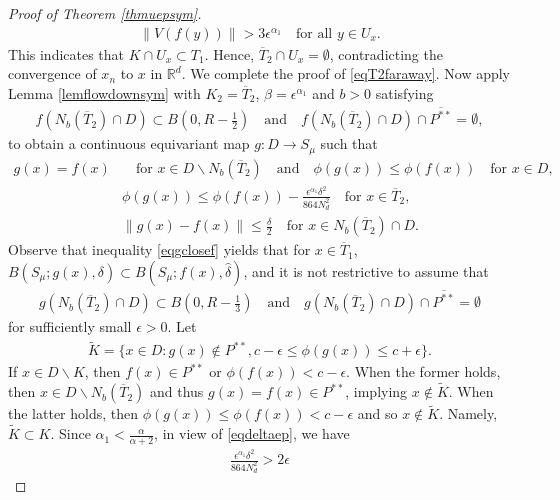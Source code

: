 \documentclass[10pt,a4paper]{article}
\theoremstyle{definition} \theoremstyle{remark}
\numberwithin{equation}{section}
\newcommand{\R}{\mathbb{R}}
\newcommand{\ep}{\epsilon}
\begin{document}
\begin{proof}[Proof of Theorem \ref{thmuepsym}]
	\begin{align*}
		\|V(f(y))\| > 3\ep^{\alpha_1} \quad \text{for all } y \in U_x.
	\end{align*}
	This indicates that $K \cap U_x \subset T_1$. Hence, $\overline{T}_2 \cap U_x  = \emptyset$, contradicting the convergence of $x_n$ to $x$ in $\R^d$. We complete the proof of \eqref{eqT2faraway}. Now apply Lemma \ref{lemflowdownsym} with $K_2 = \overline T_2$, $\beta = \ep^{\alpha_1}$ and $b > 0$ satisfying
	\begin{align*}
		f(N_b(\overline T_2) \cap D) \subset B(0,R-\frac12) \quad \text{and} \quad f(N_b(\overline T_2) \cap D) \cap \overline{P^{**}} = \emptyset,
	\end{align*}
	to obtain a continuous equivariant map $g : D \to S_\mu$ such that
	\begin{align}
		g(x) = f(x) & \quad \text{for } x \in D \backslash N_b(\overline T_2) \quad \text{and} \quad \phi(g(x)) \leq \phi(f(x)) \quad \text{for } x \in D, \\
		& \phi(g(x)) \leq \phi(f(x)) - \frac{\ep^{\alpha_1}\delta^2}{864N_d^2} \quad \text{for } x \in \overline T_2, \label{eqg(x)down} \\
		& \|g(x) - f(x)\| \leq \frac\delta 2 \quad \text{for } x \in N_b(\overline T_2) \cap D. \label{eqgclosef}
	\end{align}
	Observe that inequality \eqref{eqgclosef} yields that for $x \in \overline T_1$, $B(S_\mu; g(x),\delta) \subset B(S_\mu;f(x),\hat\delta)$, and it is not restrictive to assume that
	\begin{align*}
		g(N_b(\overline T_2) \cap D) \subset B(0,R-\frac13) \quad \text{and} \quad g(N_b(\overline T_2) \cap D) \cap \overline{P^{**}} = \emptyset
	\end{align*}
	for sufficiently small $\ep > 0$. Let \begin{align*}
		\tilde K = \bigl\{x \in D: g(x) \notin P^{**}, c-\ep \leq \phi(g(x)) \leq c+\ep\bigr\}.
	\end{align*}
	If $x \in D \backslash K$, then $f(x) \in P^{**}$ or $\phi(f(x)) < c-\ep$. When the former holds, then $x \in D \backslash N_b(\overline T_2)$ and thus $g(x) = f(x) \in P^{**}$, implying $x \notin \tilde K$. When the latter holds, then $\phi(g(x)) \leq \phi(f(x)) < c -\ep$ and so $x \notin \tilde K$. Namely, $\tilde K \subset K$. Since $\alpha_1 < \frac{\alpha}{\alpha+2}$, in view of \eqref{eqdeltaep}, we have
	\begin{align} \label{eqdownmorethan2ep}
		\frac{\ep^{\alpha_1}\delta^2}{864N_d^2} > 2\ep

\end{align}
\end{proof}
\end{document}
